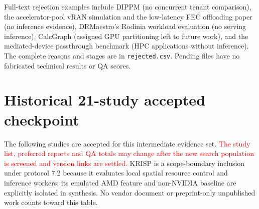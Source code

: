 \documentclass[12pt,a4paper]{article}
\newcommand{\pending}[1]{\textcolor{red}{#1}}
\begin{document}
Full-text rejection examples include DIPPM (no concurrent tenant comparison), the accelerator-pool vRAN simulation and the low-latency FEC offloading paper (no inference evidence), DRMaestro's Rodinia workload evaluation (no serving inference), CalcGraph (assigned GPU partitioning left to future work), and the mediated-device passthrough benchmark (HPC applications without inference). The complete reasons and stages are in \texttt{rejected.csv}. Pending files have no fabricated technical results or QA scores.





\section{Historical 21-study accepted checkpoint}
The following studies are accepted for this intermediate evidence set. \pending{The study list, preferred reports and QA totals may change after the new search population is screened and version links are settled.} KRISP is a scope-boundary inclusion under protocol 7.2 because it evaluates local spatial resource control and inference workers; its emulated AMD feature and non-NVIDIA baseline are explicitly isolated in synthesis. No vendor document or preprint-only unpublished work counts toward this table.
\end{document}
